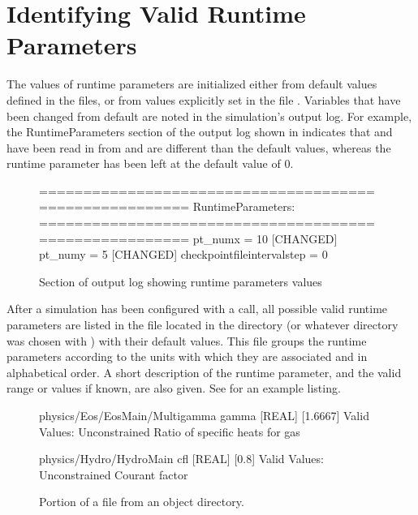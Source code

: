 \section{Identifying Valid Runtime Parameters}
The values of runtime parameters are initialized either from
default values defined in the  files, or from values
explicitly set in the file .  Variables that have been changed
from default are noted in the simulation's output log.  For example,
the RuntimeParameters section of the output log shown in
 indicates that
 and  have been read
in from  and are different than the default values,
whereas the runtime parameter  has
been left at the default value of 0.
\begin{figure}
  \begin{fcodeseg}
=======================================================
RuntimeParameters:
=======================================================
pt_numx                     =         10 [CHANGED]
pt_numy                     =          5 [CHANGED]
checkpointfileintervalstep  =          0
\end{fcodeseg}
\caption{Section of output log showing runtime parameters values}
\label{Fig:RuntimeParametersOutput}
\end{figure}

After a simulation has been configured with a  call, all possible valid runtime parameters are
listed in the file  located in the  directory (or whatever directory was chosen with ) with their default values.
This file groups the runtime parameters according to the units with which
 they
are associated and in alphabetical order.  A short description of the
runtime parameter, and the valid range or values if known, are also
given.  See  for an example
listing.
\begin{figure}
\begin{fcodeseg}
physics/Eos/EosMain/Multigamma
    gamma [REAL] [1.6667]
        Valid Values: Unconstrained
        Ratio of specific heats for gas

physics/Hydro/HydroMain
    cfl [REAL] [0.8]
        Valid Values: Unconstrained
        Courant factor
\end{fcodeseg}
\caption{Portion of a  file from an object directory.}
\label{Fig:RuntimeParametersSetup}
\end{figure}

